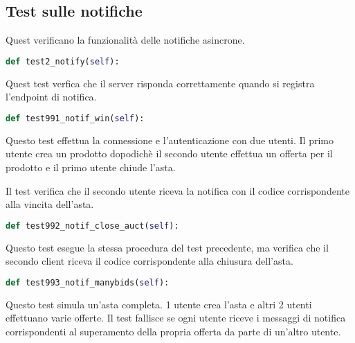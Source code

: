 \subsection{Test sulle notifiche}
Quest verificano la funzionalità delle notifiche asincrone.

\begin{lstlisting}[language=python]
def test2_notify(self):
\end{lstlisting}
Quest test verfica che il server risponda correttamente quando si registra l'endpoint di notifica.

\begin{lstlisting}[language=python]
def test991_notif_win(self):
\end{lstlisting}
Questo test effettua la connessione e l'autenticazione con due utenti. Il primo utente crea un prodotto dopodichè il secondo utente effettua un offerta per il prodotto e il primo utente chiude l'asta.

Il test verifica che  il secondo utente riceva la notifica con il codice corrispondente alla vincita dell'asta.
\begin{lstlisting}[language=python]
def test992_notif_close_auct(self):
\end{lstlisting}
Questo test esegue la stessa procedura del test precedente,  ma verifica che il secondo client riceva il codice corrispondente alla chiusura dell'asta.


\begin{lstlisting}[language=python]
def test993_notif_manybids(self):
\end{lstlisting}
Questo test simula un'asta completa.
1 utente crea l'asta e altri 2 utenti effettuano varie offerte.
Il test fallisce se ogni utente riceve i messaggi di notifica corrispondenti al superamento della propria offerta da parte di un'altro utente.
